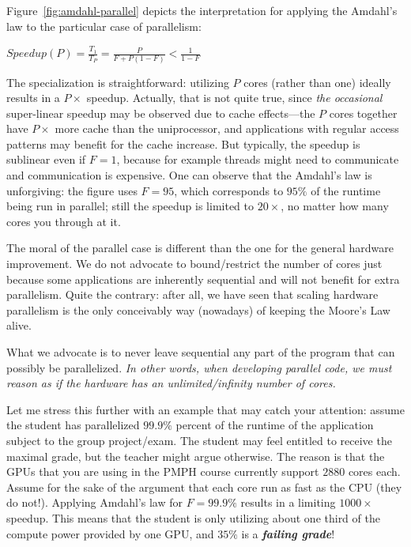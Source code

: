 \documentclass[acmsmall,review]{acmart}\settopmatter{printfolios=true,printccs=false,printacmref=false}
\begin{document}
Figure~\ref{fig:amdahl-parallel} depicts the interpretation for
applying the Amdahl's law to the particular case of parallelism:
\begin{center}
$Speedup(P) = \frac{T_1}{T_P} = \frac{P}{F+P(1-F)}<\frac{1}{1-F}$
\end{center}
The specialization is straightforward: utilizing $P$ cores (rather 
than one) ideally results in a $P\times$ speedup. Actually, that 
is not quite true, since \emph{the occasional} super-linear speedup 
may be observed due to cache effects---the $P$ cores together have 
$P\times$ more cache than the uniprocessor, and applications 
with regular access patterns may benefit for the cache increase.
But typically, the speedup is sublinear even if $F=1$, because
for example threads might need to communicate and communication 
is expensive. One can observe that the Amdahl's law is unforgiving:
the figure uses $F=95$, which corresponds to $95\%$ of the runtime
being run in parallel; still the speedup is limited to $20\times$,
no matter how many cores you through at it.

The moral of the parallel case is different than the one for the
general hardware improvement. We do not advocate to bound/restrict 
the number of cores just because some applications are inherently
sequential and will not benefit for extra parallelism. Quite the
contrary: after all, we have seen that scaling hardware parallelism
is the only conceivably way (nowadays) of keeping the Moore's Law
alive. 

What we advocate is to never leave sequential any part of 
the program that can possibly be parallelized. \emph{In other words, 
when developing parallel code, we must reason as if the hardware 
has an unlimited/infinity number of cores.}

Let me stress this further with an example that may catch your attention: 
assume the student has parallelized $99.9\%$ percent of the runtime of 
the application subject to the group project/exam. The student may feel 
entitled to receive the maximal grade, but the teacher might argue 
otherwise. The reason is that the GPUs that you are using in the PMPH 
course currently support $2880$ cores each.   Assume for the sake of 
the argument that each core run as fast as the CPU (they do not!). 
Applying Amdahl's law for $F=99.9\%$ results in a limiting
$1000\times$ speedup. This means that the student is only utilizing
about one third of the compute power provided by one GPU, and $35\%$
is a \emph{\bf failing grade}!\\
$\mbox{ }$\\
\end{document}
